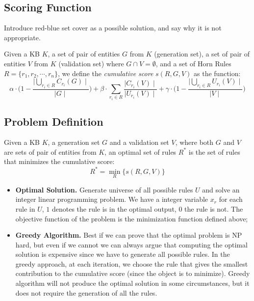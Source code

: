\subsection{Scoring Function}

{\color{red} Introduce red-blue set cover as a possible solution, and
	say why it is not appropriate.}

Given a KB $K$, a set of pair of entities $G$ from $K$ (generation set), a set of pair of entities $V$ from $K$ (validation set) where $G \cap V = \emptyset$, and a set of Horn Rules $R=\{r_1,r_2,\cdots,r_n\}$, we define the \emph{cumulative score} $s(R,G,V)$ as the function:
\begin{equation*}
	\alpha \cdot \bigg(1-\frac{\mid\bigcup\limits_{r_i \in R} C_{r_i}(G)\mid}{\mid G \mid}\bigg) +\beta \cdot \sum_{r_i \in R}\frac{\mid C_{r_i}(V) \mid}{\mid U_{r_i}(V)\mid}  +\gamma \cdot \bigg(1-\frac{\mid\bigcup\limits_{r_i \in R} U_{r_i}(V)\mid}{\mid V \mid}\bigg)
\end{equation*}

\subsection{Problem Definition}
Given a KB $K$, a generation set $G$ and a validation set $V$, where both $G$ and $V$ are sets of pair of entities from $K$, an optimal set of rules $R^*$ is the set of rules that minimizes the cumulative score:
\begin{equation*}
R^* = \min\limits_{R}\{s(R,G,V)\}
\end{equation*}
\begin{itemize}
\item \textbf{Optimal Solution.} Generate universe of all possible rules $U$ and solve an integer linear programming problem. We have a integer variable $x_r$ for each rule in $U$, $1$ denotes the rule is in the optimal output, $0$ the rule is not. The objective function of the problem is the minimization function defined above;
\item \textbf{Greedy Algorithm.} Best if we can prove that the optimal problem is NP hard, but even if we cannot we can always argue that computing the optimal solution is expensive since we have to generate all possible rules. In the greedy approach, at each iteration, we choose the rule that gives the smallest contribution to the cumulative score (since the object is to minimize). Greedy algorithm will not produce the optimal solution in some circumstances, but it does not require the generation of all the rules.
\end{itemize}